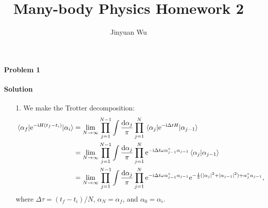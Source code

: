 \documentclass[hyperref, a4paper]{article}
\title{Many-body Physics Homework 2}
\author{Jinyuan Wu}
\newcommand*{\ii}{\mathrm{i}}
\newcommand*{\ee}{\mathrm{e}}
\begin{document}
\maketitle

\paragraph{Problem 1}

\paragraph{Solution} \begin{itemize}
\item[1.] We make the Trotter decomposition:
\begin{equation}
    \begin{aligned}
        \mel{\alpha_f}{\ee^{- \ii H(t_f - t_i)}}{\alpha_i} &= \lim_{N \to \infty}
        \prod_{j=1}^{N-1} \int \frac{\dd{\alpha_j}}{\pi} \prod_{j=1}^N \mel{\alpha_j}{\ee^{- \ii \Delta t H}}{\alpha_{j-1}} \\
        &= \lim_{N\to \infty} \prod_{j=1}^{N-1} \int \frac{\dd{\alpha_j}}{\pi} \prod_{j=1}^N 
        \ee^{- \ii \Delta t \omega \alpha_{j-1}^* \alpha_{j-1}} \braket*{\alpha_j}{\alpha_{j-1}} \\
        &= \lim_{N \to \infty} \prod_{j=1}^{N-1} \int \frac{\dd{\alpha_j}}{\pi} \prod_{j=1}^N 
        \ee^{- \ii \Delta t \omega \alpha_{j-1}^* \alpha_{j-1}}
        \ee^{- \frac{1}{2} (\abs{\alpha_j}^2 + \abs{\alpha_{j-1}}^2) + \alpha_j^* \alpha_{j-1}} ,
    \end{aligned}
\end{equation}
where $\Delta \tau = (t_f - t_i) / N$, $\alpha_N = \alpha_f$,
and $\alpha_0 = \alpha_i$.


\end{itemize}
\end{document}
